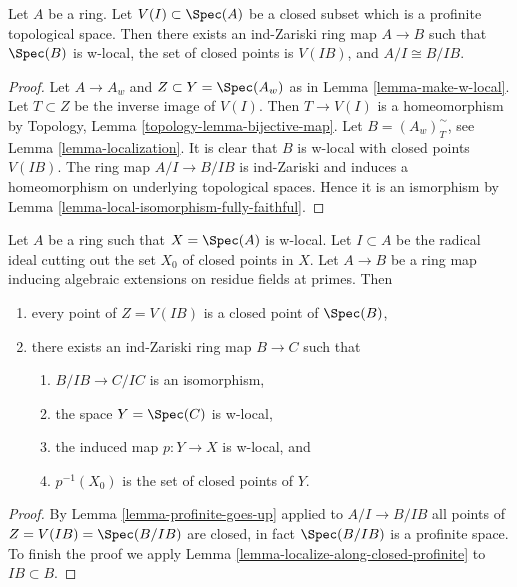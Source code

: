 \begin{lemma}
\label{lemma-localize-along-closed-profinite}
Let $A$ be a ring. Let $V(I) \subset \Spec(A)$ be a closed subset
which is a profinite topological space. Then there exists an
ind-Zariski ring map $A \to B$ such that $\Spec(B)$ is w-local,
the set of closed points is $V(IB)$, and $A/I \cong B/IB$.
\end{lemma}

\begin{proof}
Let $A \to A_w$ and $Z \subset Y = \Spec(A_w)$ as in
Lemma \ref{lemma-make-w-local}.
Let $T \subset Z$ be the inverse image of $V(I)$.
Then $T \to V(I)$ is a homeomorphism by
Topology, Lemma \ref{topology-lemma-bijective-map}.
Let $B = (A_w)_T^\sim$, see Lemma \ref{lemma-localization}.
It is clear that $B$ is w-local with closed points $V(IB)$.
The ring map $A/I \to B/IB$ is ind-Zariski
and induces a homeomorphism on underlying
topological spaces. Hence it is an ismorphism by
Lemma \ref{lemma-local-isomorphism-fully-faithful}.
\end{proof}

\begin{lemma}
\label{lemma-w-local-algebraic-residue-field-extensions}
Let $A$ be a ring such that $X = \Spec(A)$ is w-local. Let $I \subset A$
be the radical ideal cutting out the set $X_0$ of closed points in $X$.
Let $A \to B$ be a ring map inducing algebraic extensions on residue
fields at primes. Then
\begin{enumerate}
\item every point of $Z = V(IB)$ is a closed point of $\Spec(B)$,
\item there exists an ind-Zariski ring map $B \to C$ such that
\begin{enumerate}
\item $B/IB \to C/IC$ is an isomorphism,
\item the space $Y = \Spec(C)$ is w-local,
\item the induced map $p : Y \to X$ is w-local, and
\item $p^{-1}(X_0)$ is the set of closed points of $Y$.
\end{enumerate}
\end{enumerate}
\end{lemma}

\begin{proof}
By Lemma \ref{lemma-profinite-goes-up} applied to $A/I \to B/IB$
all points of $Z = V(IB) = \Spec(B/IB)$ are closed, in fact $\Spec(B/IB)$
is a profinite space.
To finish the proof we apply Lemma \ref{lemma-localize-along-closed-profinite}
to $IB \subset B$.
\end{proof}





